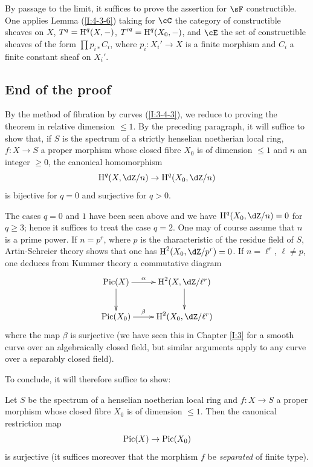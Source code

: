 By passage to the limit, it suffices to prove the assertion for $\sF$
constructible. One applies Lemma (\ref{I:4-3-6}) taking for $\cC$ the
category of constructible sheaves on $X$, $T^q=\operatorname{H}^q(X,-)$,
${T'}^q=\operatorname{H}^q(X_0,-)$, and $\cE$ the set of constructible sheaves of the
form $\prod p_{i*} C_i$, where $p_i:X_i'\to X$ is a finite morphism and $C_i$
a finite constant sheaf on $X_i'$.










\subsection{End of the proof}\label{I:4-4}

By the method of fibration by curves (\ref{I:3-4-3}), we reduce to
proving the theorem in relative dimension $\leqslant 1$. By
the preceding paragraph, it will suffice to show that, if $S$ is the spectrum
of a strictly henselian noetherian local ring, $f:X\to S$ a
proper morphism whose closed fibre $X_0$ is of dimension $\leqslant 1$
and $n$ an integer $\geqslant 0$, the canonical homomorphism
\[
  \h^q(X,\dZ/n) \to \h^q(X_0,\dZ/n)
\]
is bijective for $q=0$ and surjective for $q>0$.

The cases $q=0$ and $1$ have been seen above and we have $\h^q(X_0,\dZ/n) = 0$
for $q\geqslant 3$; hence it suffices to treat the case $q=2$. One may
of course assume that $n$ is a prime power. If
$n=p^r$, where $p$ is the characteristic of the residue field of $S$,
Artin-Schreier theory shows that one has $\h^2(X_0,\dZ/p^r) = 0$. If
$n=\ell^r$, $\ell\ne p$, one deduces from Kummer theory a commutative
diagram
\[\xymatrix{
  \pic(X) \ar[d] \ar[r]^-\alpha
    & \h^2(X,\dZ/\ell^r) \ar[d] \\
  \pic(X_0) \ar[r]^-\beta
    & \h^2(X_0,\dZ/\ell^r)
}\]
where the map $\beta$ is surjective (we have seen this in Chapter \ref{I:3} for
a smooth curve over an algebraically closed field, but similar arguments
apply to any curve over a separably closed field).

To conclude, it will therefore suffice to show:





\begin{proposition}\label{I:4-4-1}
Let $S$ be the spectrum of a henselian noetherian local ring and $f:X\to S$
a proper morphism whose closed fibre $X_0$ is of dimension
$\leqslant 1$. Then the canonical restriction map
\[
  \operatorname{Pic}(X)\to \operatorname{Pic}(X_0)
\]
is surjective (it suffices moreover that the morphism $f$ be
\emph{separated} of finite type).
\end{proposition}

